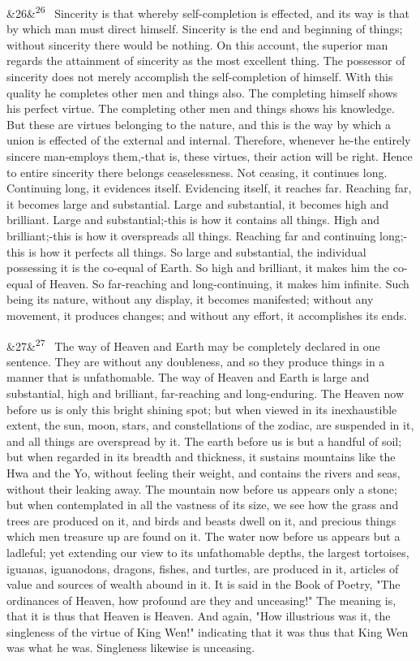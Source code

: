 \documentclass[12pt]{article}
\newcommand{\para}[1][]{\par\noindent\ifx&#1&\else\textsuperscript{\footnotesize #1}~\fi}
\begin{document}
\para[26] Sincerity is that whereby self-completion is effected, and its way is that by which man must direct himself. Sincerity is the end and beginning of things; without sincerity there would be nothing. On this account, the superior man regards the attainment of sincerity as the most excellent thing. The possessor of sincerity does not merely accomplish the self-completion of himself. With this quality he completes other men and things also. The completing himself shows his perfect virtue. The completing other men and things shows his knowledge. But these are virtues belonging to the nature, and this is the way by which a union is effected of the external and internal. Therefore, whenever he-the entirely sincere man-employs them,-that is, these virtues, their action will be right. Hence to entire sincerity there belongs ceaselessness. Not ceasing, it continues long. Continuing long, it evidences itself. Evidencing itself, it reaches far. Reaching far, it becomes large and substantial. Large and substantial, it becomes high and brilliant. Large and substantial;-this is how it contains all things. High and brilliant;-this is how it overspreads all things. Reaching far and continuing long;-this is how it perfects all things. So large and substantial, the individual possessing it is the co-equal of Earth. So high and brilliant, it makes him the co-equal of Heaven. So far-reaching and long-continuing, it makes him infinite. Such being its nature, without any display, it becomes manifested; without any movement, it produces changes; and without any effort, it accomplishes its ends.

\para[27] The way of Heaven and Earth may be completely declared in one sentence. They are without any doubleness, and so they produce things in a manner that is unfathomable. The way of Heaven and Earth is large and substantial, high and brilliant, far-reaching and long-enduring. The Heaven now before us is only this bright shining spot; but when viewed in its inexhaustible extent, the sun, moon, stars, and constellations of the zodiac, are suspended in it, and all things are overspread by it. The earth before us is but a handful of soil; but when regarded in its breadth and thickness, it sustains mountains like the Hwa and the Yo, without feeling their weight, and contains the rivers and seas, without their leaking away. The mountain now before us appears only a stone; but when contemplated in all the vastness of its size, we see how the grass and trees are produced on it, and birds and beasts dwell on it, and precious things which men treasure up are found on it. The water now before us appears but a ladleful; yet extending our view to its unfathomable depths, the largest tortoises, iguanas, iguanodons, dragons, fishes, and turtles, are produced in it, articles of value and sources of wealth abound in it. It is said in the Book of Poetry, "The ordinances of Heaven, how profound are they and unceasing!" The meaning is, that it is thus that Heaven is Heaven. And again, "How illustrious was it, the singleness of the virtue of King Wen!" indicating that it was thus that King Wen was what he was. Singleness likewise is unceasing.
\end{document}
